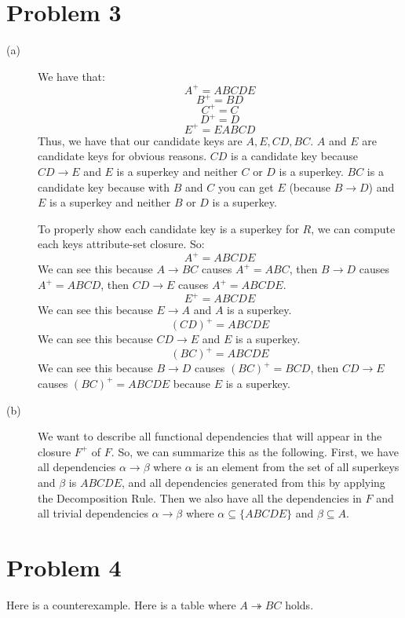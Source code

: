 \documentclass{article}
\begin{document}
\section*{Problem 3}
\begin{description}
    \item[(a)] We have that:
        \[ A^+ = ABCDE \]
        \[ B^+ = BD \]
        \[ C^+ = C \]
        \[ D^+ = D \]
        \[ E^+ = EABCD \]
        Thus, we have that our candidate keys are $A, E, CD, BC$. $A$ and $E$
        are candidate keys for obvious reasons. $CD$ is a candidate key
        because $CD \rightarrow E$ and $E$ is a superkey and neither $C$
        or $D$ is a superkey. $BC$ is a candidate key because with $B$
        and $C$ you can get $E$ (because $B \rightarrow D$) and $E$ is a superkey
        and neither $B$ or $D$ is a superkey.

        To properly show each candidate key is a superkey for $R$, we can compute
        each keys attribute-set closure.
        So:
        \[ A^+ = ABCDE \]
        We can see this because $A \rightarrow BC$ causes $A^+ = ABC$, then
        $B \rightarrow D$ causes $A^+ = ABCD$, then $CD \rightarrow E$ causes
        $A^+ = ABCDE$.
        \[ E^+ = ABCDE \]
        We can see this because $E \rightarrow A$ and $A$ is a superkey.
        \[ (CD)^+ = ABCDE \]
        We can see this because $CD \rightarrow E$ and $E$ is a superkey.
        \[ (BC)^+ = ABCDE \]
        We can see this because $B \rightarrow D$ causes $(BC)^+ = BCD$, then
        $CD \rightarrow E$ causes $(BC)^+ = ABCDE$ because $E$ is a
        superkey.
    \item[(b)]
        We want to describe all functional dependencies that will appear in the
        closure $F^+$ of $F$. So, we can summarize this as the following.
        First, we have all dependencies
        $\alpha \rightarrow \beta$
        where $\alpha$ is an element from the set of all superkeys
        and $\beta$ is $ABCDE$, and all dependencies generated from this by applying
        the Decomposition Rule. Then we also have all the dependencies in $F$ and
        all trivial dependencies $\alpha \rightarrow \beta$ where $\alpha
        \subseteq \{ABCDE\}$ and $\beta \subseteq A$.
\end{description}

\section*{Problem 4}
Here is a counterexample. Here is a table where
$A \twoheadrightarrow BC$ holds.
\end{document}
